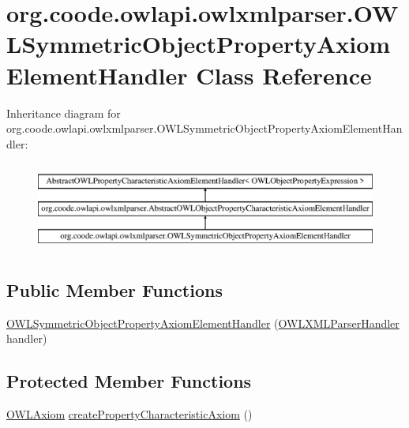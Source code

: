 \hypertarget{classorg_1_1coode_1_1owlapi_1_1owlxmlparser_1_1_o_w_l_symmetric_object_property_axiom_element_handler}{\section{org.\-coode.\-owlapi.\-owlxmlparser.\-O\-W\-L\-Symmetric\-Object\-Property\-Axiom\-Element\-Handler Class Reference}
\label{classorg_1_1coode_1_1owlapi_1_1owlxmlparser_1_1_o_w_l_symmetric_object_property_axiom_element_handler}
}
Inheritance diagram for org.\-coode.\-owlapi.\-owlxmlparser.\-O\-W\-L\-Symmetric\-Object\-Property\-Axiom\-Element\-Handler\-:\begin{figure}[H]
\begin{center}
\leavevmode
\includegraphics[height=2.984014cm]{classorg_1_1coode_1_1owlapi_1_1owlxmlparser_1_1_o_w_l_symmetric_object_property_axiom_element_handler}
\end{center}
\end{figure}
\subsection*{Public Member Functions}
\begin{DoxyCompactItemize}
\item 
\hyperlink{classorg_1_1coode_1_1owlapi_1_1owlxmlparser_1_1_o_w_l_symmetric_object_property_axiom_element_handler_a694ae3111b20f8b19dc77a690946574c}{O\-W\-L\-Symmetric\-Object\-Property\-Axiom\-Element\-Handler} (\hyperlink{classorg_1_1coode_1_1owlapi_1_1owlxmlparser_1_1_o_w_l_x_m_l_parser_handler}{O\-W\-L\-X\-M\-L\-Parser\-Handler} handler)
\end{DoxyCompactItemize}
\subsection*{Protected Member Functions}
\begin{DoxyCompactItemize}
\item 
\hyperlink{interfaceorg_1_1semanticweb_1_1owlapi_1_1model_1_1_o_w_l_axiom}{O\-W\-L\-Axiom} \hyperlink{classorg_1_1coode_1_1owlapi_1_1owlxmlparser_1_1_o_w_l_symmetric_object_property_axiom_element_handler_afadf2e7faa9c383fac068082b09d68f7}{create\-Property\-Characteristic\-Axiom} ()
\end{DoxyCompactItemize}


